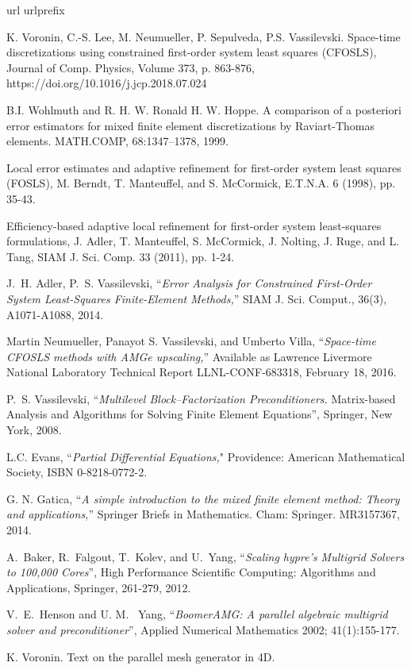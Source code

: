 \documentclass[a4paper,12pt]{amsart}
\numberwithin{equation}{section}
\begin{document}
\begin{thebibliography}{99}
\expandafter\ifx\csname url\endcsname\relax
  \def\url#1{\texttt{#1}}\fi
\expandafter\ifx\csname urlprefix\endcsname\relax\def\urlprefix{URL }\fi

K. Voronin, C.-S. Lee, M. Neumueller, P. Sepulveda, P.S. Vassilevski. Space-time discretizations using constrained first-order system least squares (CFOSLS), Journal of Comp. Physics, Volume 373, p. 863-876, https://doi.org/10.1016/j.jcp.2018.07.024

B.I. Wohlmuth and R. H. W. Ronald H. W. Hoppe. A comparison of a posteriori error estimators for mixed finite element discretizations by Raviart-Thomas elements. MATH.COMP, 68:1347–1378, 1999.

Local error estimates and adaptive refinement for first-order system least squares (FOSLS), M. Berndt, T. Manteuffel, and S. McCormick, E.T.N.A. 6 (1998), pp. 35-43.

Efficiency-based adaptive local refinement for first-order system least-squares formulations, J. Adler, T. Manteuffel, S. McCormick, J. Nolting, J. Ruge, and L. Tang, SIAM J. Sci. Comp. 33 (2011), pp. 1-24. 

{\sc J.~H. Adler, P.~S. Vassilevski,}
``{\em Error Analysis for Constrained First-Order System Least-Squares Finite-Element Methods,}''
SIAM J. Sci. Comput., 36(3), A1071-A1088, 2014.

Martin Neumueller, Panayot S. Vassilevski, and Umberto Villa,
``{\em Space-time CFOSLS methods with AMGe upscaling,}''
Available as Lawrence Livermore National Laboratory Technical Report LLNL-CONF-683318, February 18, 2016.

{\sc P.~S. Vassilevski,}
``{\em Multilevel Block--Factorization Preconditioners.} 
Matrix-based Analysis and Algorithms for Solving Finite Element Equations'',
Springer, New York, 2008.

{\sc L.C. Evans,}
 ``{\em Partial Differential Equations,}" Providence: American Mathematical Society, ISBN 0-8218-0772-2. 

{\sc  G. N. Gatica,} ``{\em A simple introduction to the mixed finite element method: Theory and applications,}'' Springer Briefs in Mathematics. Cham: Springer. MR3157367, 2014.

{\sc A.~Baker, R.~Falgout, T.~Kolev, and U.~Yang,} 
``{\em Scaling hypre's Multigrid Solvers to 100,000 Cores}'',
High Performance Scientific Computing: Algorithms and Applications, Springer,  261-279, 2012.

{\sc V.~E.~Henson and U. M.~ Yang,} ``{\em Boomer{AMG}: A parallel algebraic multigrid solver and preconditioner}'',
Applied Numerical Mathematics 2002; 41(1):155-177.

K. Voronin. Text on the parallel mesh generator in 4D.

\end{thebibliography}
\end{document}

